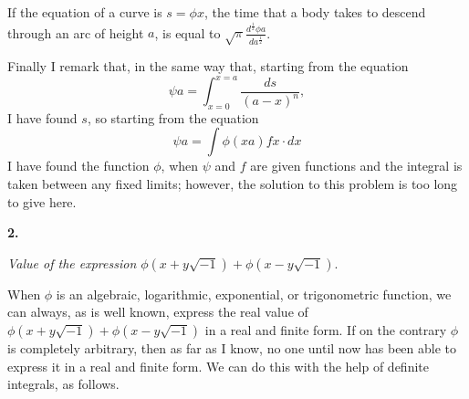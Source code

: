 \documentclass[12pt]{article}
\begin{document}
\begin{center} If the equation of a curve is $s = \phi x$, the time that a body takes to descend through an arc of height $a$, is equal to $\sqrt{\pi} \frac{d^{\frac{1}{2}} \phi a}{da^{\frac{1}{2}}} $. \end{center}

Finally I remark that, in the same way that, starting from the equation
\[ \psi a = \int_{x=0}^{x=a} \frac{ds}{(a-x)^n}, \]
I have found $s$, so starting from the equation
\[ \psi a = \int \phi(xa) fx \cdot dx \]
I have found the function $\phi$, when $\psi$ and $f$ are given functions and the integral is taken between any fixed limits; however, the solution to this problem is too long to give here.

\pagebreak
\begin{center}
\textbf{2.}

\emph{Value of the expression $\phi(x+y\sqrt{-1}) + \phi( x- y \sqrt{-1})$}.
\end{center}

When $\phi$ is an algebraic, logarithmic, exponential, or trigonometric function, we can always, as is well known, express the real value of $\phi(x+y\sqrt{-1}) + \phi( x- y \sqrt{-1})$ in a real and finite form.  If on the contrary $\phi$ is completely arbitrary, then as far as I know, no one until now has been able to express it in a real and finite form.   We can do this with the help of definite integrals, as follows.
\end{document}
